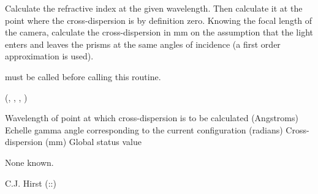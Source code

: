 \begin{manroutinedescription}
     Calculate the refractive index at the given wavelength. Then calculate it
     at the point where the cross-dispersion is by definition zero. Knowing
     the focal length of the camera, calculate the cross-dispersion in mm on
     the assumption that the light enters and leaves the prisms at the same
     angles of incidence (a first order approximation is used).

     {} must be called before calling this routine.

     {} {} ({}, {}, {%
}, {})

\begin{manparametertable}
Wavelength of point at which
                                      cross-dispersion is to be calculated
                                      (Angstroms)
Echelle gamma angle corresponding to the
                                      current configuration (radians)
Cross-dispersion (mm)
 Global status value
\end{manparametertable}
     None known.

     C.J. Hirst  {}  ({}::{})

\end{manroutinedescription}


